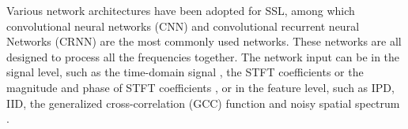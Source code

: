 \documentclass[lettersize,journal]{IEEEtran}
\begin{document}
Various network architectures have been adopted for SSL, among which convolutional neural networks (CNN) \cite{He2021NeuralNA,DiazGuerra2022DirectionOA,Cho2023SRSRPSB,Fu2022IterativeSS} and convolutional recurrent neural Networks\cite{yang2021learning, Yang2022SRPDNNLD,Wang2023FramewiseMS} (CRNN) 
are the most commonly used networks. These networks are all designed to process all the frequencies together. 
The network input can be in the signal level, such as the time-domain signal \cite{Vecchiotti2019EndtoendBS}, the STFT coefficients \cite{Fu2022IterativeSS,WYBIS23} or the magnitude and phase of STFT coefficients \cite{He2021NeuralNA,yang2021learning,Yang2022SRPDNNLD}, or in the feature level, such as IPD, IID, the generalized cross-correlation (GCC) function \cite{Xiao2015ALA, Ma2017ExploitingDN, TDOA_LSTM_ICASSP19}  and noisy spatial spectrum \cite{DiazGuerra2020RobustSS,DiazGuerra2022DirectionOA,Cho2023SRSRPSB}. 
\end{document}
